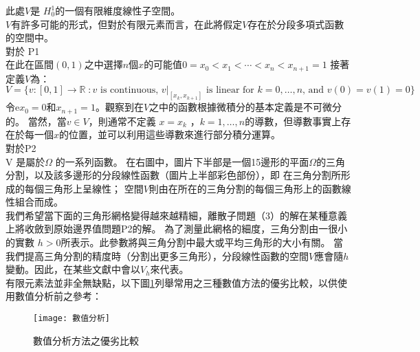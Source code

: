 \begin{itemize}
\qquad 此處$ V $是 ${\displaystyle H_{0}^{1}}$的一個有限維度線性子空間。\\

\qquad $ V$有許多可能的形式，但對於有限元素而言，在此將假定$ V$存在於分段多項式函數的空間中。 \\

對於 P1\\

\qquad 在此在區間$ (0,1)$之中選擇$ n$個$ x$的可能值$ {\displaystyle 0=x_{0}<x_{1}<\cdots <x_{n}<x_{n+1}=1}$ 接著定義$ V $為：\\

$ {\displaystyle V=\{v:[0,1]\rightarrow \mathbb {R} \;:v{\mbox{ is continuous, }}v|_{[x_{k},x_{k+1}]}{\mbox{ is linear for }}k=0,\dots ,n{\mbox{, and }}v(0)=v(1)=0\}}$\\

\qquad 令e$ x_0=0 $和$ {\displaystyle x_{n+1}=1}$。觀察到在$ V $之中的函數根據微積分的基本定義是不可微分的。 當然，當$v \in V$，則通常不定義 $ {\displaystyle x=x_{k}}$ ，${\displaystyle k=1,\ldots ,n}$的導數，但導數事實上存在於每一個$ x$的位置，並可以利用這些導數來進行部分積分運算。 \\

對於P2\\

\qquad V 是屬於$ \Omega$ 的一系列函數。 在右圖中，圖片下半部是一個15邊形的平面$ \Omega $的三角分割，以及該多邊形的分段線性函數（圖片上半部彩色部份），即 在三角分割所形成的每個三角形上呈線性； 空間$ V$則由在所在的三角分割的每個三角形上的函數線性組合而成。\\

\qquad 我們希望當下面的三角形網格變得越來越精細，離散子問題（3）的解在某種意義上將收斂到原始邊界值問題P2的解。 為了測量此網格的細度，三角分割由一很小的實數 $ {\displaystyle h>0}$所表示。此參數將與三角分割中最大或平均三角形的大小有關。 當我們提高三角分割的精度時（分割出更多三角形），分段線性函數的空間$ V$應會隨$ h$變動。因此，在某些文獻中會以$V_{h}$來代表。 \\

\qquad 有限元素法並非全無缺點，以下圖\ref{2.90}列舉常用之三種數值方法的優劣比較，以供使用數值分析前之參考：\\
\begin{figure}[hbt!]
\begin{center}
\texttt{[image: 數值分析]}
\caption{\Large 數值分析方法之優劣比較}\label{2.90}
\end{center}
\end{figure}
\\
\end{itemize}
\newpage
